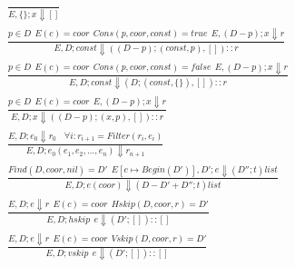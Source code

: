 \begin{figure*}[!ht]
\small
\begin{gather*}
  \tag{\sc E-Empty}\label{rule:empty}
  \frac
  {}
  {E,\{\};x \Downarrow []}\\
  \tag{\sc E-C1}\label{rule:c1}
  \frac
  {p \in D ~~ E(c)=coor ~~ Cons(p, coor, const)=true ~~ E,(D-p);x \Downarrow r}
  {E,D;const \Downarrow ((D-p);(const, p),[])::r}\\
  \tag{\sc E-C2}\label{rule:c2}
  \frac
  {p \in D ~~ E(c)=coor ~~ Cons(p, coor, const)=false ~~ E,(D-p);x \Downarrow r}
  {E,D;const \Downarrow (D;(const, \{\}),[])::r}\\
  \tag{\sc E-X}\label{rule:x}
  \frac
  {p \in D ~~ E(c)=coor ~~ E,(D-p);x \Downarrow r}
  {E,D;x \Downarrow ((D-p);(x, p),[])::r}\\
  \tag{\sc E-Constraint}\label{rule:Constraint}
  \frac
  {E,D;e_0 \Downarrow r_0 ~~~~ \forall i: r_{i+1}=Filter(r_i, e_i)}
  {E,D;e_0(e_1, e_2, ..., e_n) \Downarrow r_{n+1}}\\
  \tag{\sc E-Coor}\label{rule:coor}
  \frac
  {Find(D, coor, nil)=D' ~~ E[c \mapsto Begin(D')],D';e \Downarrow (D'';t)list}
  {E,D;e(coor) \Downarrow (D-D'+D'';t)list}\\
  \tag{\sc E-Hskip}\label{rule:hskip}
  \frac
  {E,D;e \Downarrow r ~~ E(c)=coor ~~ Hskip(D, coor, r)=D'}
  {E,D;hskip~~e \Downarrow (D';[])::[]}\\
  \tag{\sc E-Vskip}\label{rule:vskip}
  \frac
  {E,D;e \Downarrow r ~~ E(c)=coor ~~ Vskip(D, coor, r)=D'}
  {E,D;vskip~~e \Downarrow (D';[])::[]}\\
  \tag{\sc E-Union}\label{rule:union}

\end{gather*}
\end{figure*}
